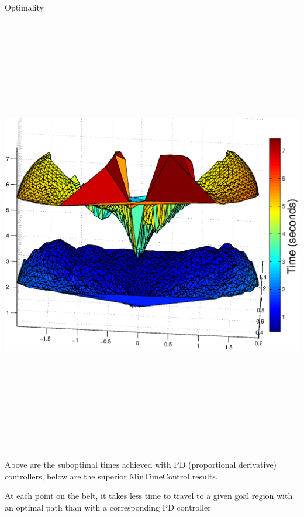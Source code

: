 \documentclass[final]{beamer}
\begin{document}
\begin{frame}{}
{\begin{columns}[t]
\begin{column}{.30\linewidth}
\begin{block}{\centering Optimality}
	 \centering\includegraphics[height=20cm, width=20cm]{figures/PDvsOptimal.eps} \\

	 Above are the suboptimal times achieved with PD (proportional derivative) controllers, below are the superior
MinTimeControl results. 

At each point on the belt, it takes less time to travel to a given goal region with
an optimal path than with a corresponding PD controller



\end{block}

 \end{column}
        

\end{columns}}
\end{frame}
\end{document}
